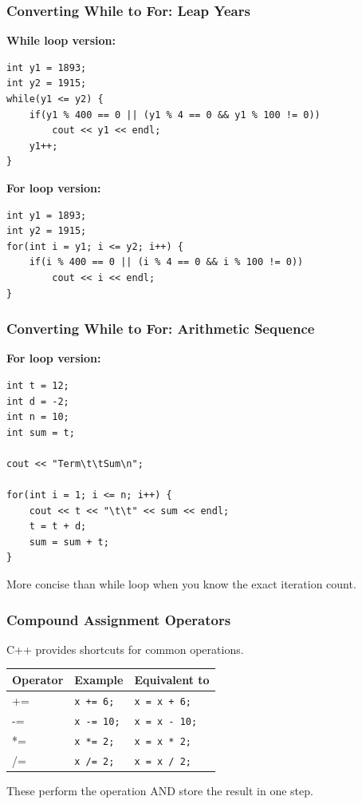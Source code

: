 \documentclass{beamer}
\begin{document}
\begin{frame}[fragile]
\frametitle{Converting While to For: Leap Years}
\textbf{While loop version:}
\begin{verbatim}
int y1 = 1893;
int y2 = 1915;
while(y1 <= y2) {
    if(y1 % 400 == 0 || (y1 % 4 == 0 && y1 % 100 != 0))
        cout << y1 << endl;
    y1++;
}
\end{verbatim}
\pause

\textbf{For loop version:}
\begin{verbatim}
int y1 = 1893;
int y2 = 1915;
for(int i = y1; i <= y2; i++) {
    if(i % 400 == 0 || (i % 4 == 0 && i % 100 != 0))
        cout << i << endl;
}
\end{verbatim}
\end{frame}

\begin{frame}[fragile]
\frametitle{Converting While to For: Arithmetic Sequence}
\textbf{For loop version:}
\begin{verbatim}
int t = 12;
int d = -2;
int n = 10;
int sum = t;

cout << "Term\t\tSum\n";

for(int i = 1; i <= n; i++) {
    cout << t << "\t\t" << sum << endl; 
    t = t + d;
    sum = sum + t;
}
\end{verbatim}

More concise than while loop when you know the exact iteration count.
\end{frame}

\begin{frame}
\frametitle{Compound Assignment Operators}
C++ provides shortcuts for common operations.\pause

\begin{center}
\begin{tabular}{|l|l|l|}
\hline
\textbf{Operator} & \textbf{Example} & \textbf{Equivalent to} \\
\hline
+= & \texttt{x += 6;} & \texttt{x = x + 6;} \\
\hline
-= & \texttt{x -= 10;} & \texttt{x = x - 10;} \\
\hline
*= & \texttt{x *= 2;} & \texttt{x = x * 2;} \\
\hline
/= & \texttt{x /= 2;} & \texttt{x = x / 2;} \\
\hline
\end{tabular}
\end{center}
\pause

These perform the operation AND store the result in one step.
\end{frame}
\end{document}
